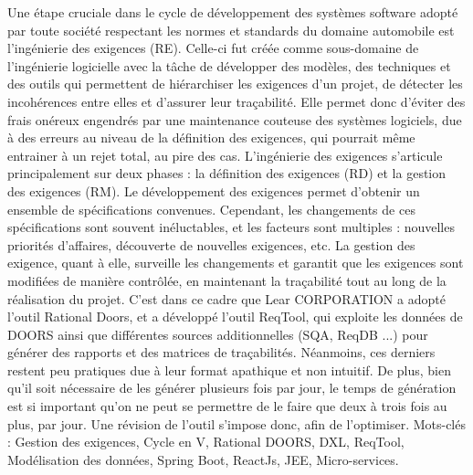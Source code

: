 Une étape cruciale dans le cycle de développement des systèmes software adopté par toute société respectant
les normes et standards du domaine automobile est l’ingénierie des exigences (RE). Celle-ci fut créée comme
sous-domaine de l’ingénierie logicielle avec la tâche de développer des modèles, des techniques et des outils qui
permettent de hiérarchiser les exigences d’un projet, de détecter les incohérences entre elles et d’assurer leur
traçabilité. Elle permet donc d’éviter des frais onéreux engendrés par une maintenance couteuse des systèmes
logiciels, due à des erreurs au niveau de la définition des exigences, qui pourrait même entrainer à un rejet total,
au pire des cas.
L’ingénierie des exigences s’articule principalement sur deux phases : la définition des exigences (RD) et la
gestion des exigences (RM). Le développement des exigences permet d’obtenir un ensemble de spécifications
convenues. Cependant, les changements de ces spécifications sont souvent inéluctables, et les facteurs sont multiples : nouvelles priorités d’affaires, découverte de nouvelles exigences, etc. La gestion des exigence, quant à
elle, surveille les changements et garantit que les exigences sont modifiées de manière contrôlée, en maintenant
la traçabilité tout au long de la réalisation du projet.
C’est dans ce cadre que Lear CORPORATION a adopté l’outil Rational Doors, et a développé l’outil ReqTool, qui exploite les données de DOORS ainsi que différentes sources additionnelles (SQA, ReqDB ...) pour
générer des rapports et des matrices de traçabilités. Néanmoins, ces derniers restent peu pratiques due à leur
format apathique et non intuitif. De plus, bien qu’il soit nécessaire de les générer plusieurs fois par jour, le
temps de génération est si important qu’on ne peut se permettre de le faire que deux à trois fois au plus, par
jour. Une révision de l’outil s’impose donc, afin de l’optimiser.
Mots-clés : Gestion des exigences, Cycle en V, Rational DOORS, DXL, ReqTool, Modélisation des données,
Spring Boot, ReactJs, JEE, Micro-services.